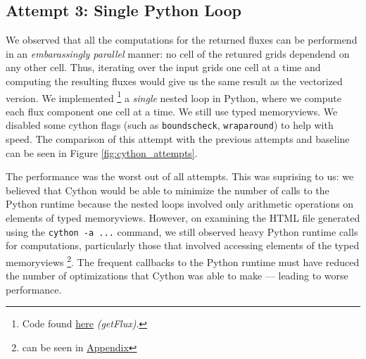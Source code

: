 \documentclass[a4paper,10pt]{article}
\begin{document}
\subsection{Attempt 3: Single \textbf{Python} Loop}
We observed that all the computations for the returned fluxes can be performend in an \textit{embarassingly parallel} manner: no cell of the retunred grids dependend on any other cell.
Thus, iterating over the input grids one cell at a time and computing the resulting fluxes would give us the same result as the vectorized version.
We implemented
\footnote{Code found \href{https://github.com/paulmyr/DD2358-HPC25/blob/master/10_project_rishi_paul/code/cython/finitevolume_cython_lib.pyx\#L287}{here} \textit{(getFlux)}.}
a \emph{single} nested loop in Python, where we compute each flux component one cell at a time.
We still use typed memoryviews.
We disabled some cython flags (such as \verb|boundscheck|, \verb|wraparound|) to help with speed.
The comparison of this attempt with the previous attempts and baseline can be seen in Figure \ref{fig:cython_attempts}. 

The performance was the worst out of all attempts.
This was suprising to us: we believed that Cython would be able to minimize the number of calls to the Python runtime because the nested loops involved only arithmetic operations on elements of typed memoryviews.
However, on examining the HTML file generated using the \verb|cython -a ...| command, we still observed heavy Python runtime calls for computations, particularly those that involved accessing elements of the typed memoryviews \footnote{can be seen in \hyperref[fig:cython_attempt_3_annotated]{Appendix}}.
The frequent callbacks to the Python runtime must have reduced the number of optimizations that Cython was able to make --- leading to worse performance.
\end{document}

